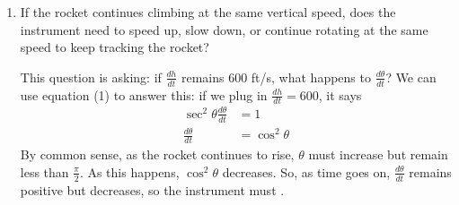 \documentclass[main]{subfiles}
\begin{document}
\begin{enumerate}
\begin{enumerate}
\begin{solution}
      \begin{align}
        \frac{d}{dt} \left( \tan \theta \right) &= \frac{d}{dt} \left(
          \frac{h}{600} \right) \nonumber \\
        \sec^2 \theta \frac{d\theta}{dt} &= \frac{1}{600}
        \frac{dh}{dt}
 \\
        \shortintertext{Plug in the snapshot information:} %
        \sec^2 \left( \frac{\pi}{4} \right) \cdot 0.5 &= \frac{1}{600}
        \frac{dh}{dt} \nonumber \\
        \shortintertext{$\cos \left( \frac{\pi}{4} \right) =
          \frac{1}{\sqrt{2}}$, so $\sec \left( \frac{\pi}{4} \right) =
          \sqrt{2}$:} %
        2 \cdot 0.5 &= \frac{1}{600} \frac{dh}{dt}, \nonumber
      \end{align}
      so $\dfrac{dh}{dt} = \boxed{600 \text{ ft/s}}$. 
    \end{solution}

  \item
    \begin{problem}[\stretch{0.5}]
      If the rocket continues climbing at the same vertical speed, does
      the instrument need to speed up, slow down, or continue
      rotating at the same speed to keep tracking the rocket?
    \end{problem}

    \begin{solution}
      This question is asking: if $\frac{dh}{dt}$ remains $600$ ft/s, what
      happens to $\frac{d\theta}{dt}$?  We can use equation (1) to answer
      this: if we plug in $\frac{dh}{dt} = 600$, it says
      \begin{align*}
        \sec^2 \theta \frac{d\theta}{dt} &= 1 \\
        \frac{d\theta}{dt} &= \cos^2 \theta
      \end{align*}
      By common sense, as the rocket continues to rise, $\theta$ must
      increase but remain less than $\frac{\pi}{2}$.  As this happens,
      $\cos^2 \theta$ decreases.  So, as time goes on,
      $\frac{d\theta}{dt}$ remains positive but decreases, so the
      instrument must .
    \end{solution}

  \end{enumerate}

  \pspace{\newpage}


\end{enumerate}
\end{document}
